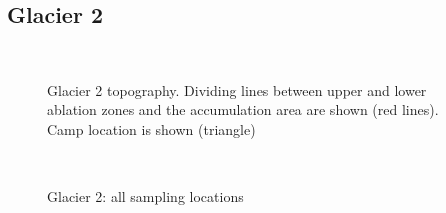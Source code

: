 \documentclass{sfuthesis}
\begin{document}
{\begin{appendices}
\section*{Glacier 2}
	\begin{figure}[H]
	\centering	
	\\
\caption[]{Glacier 2 topography. Dividing lines between upper and lower ablation zones and the accumulation area are shown (red lines). Camp location is shown (triangle) }
\end{figure}
	\begin{figure}[H]
	\centering
	\\
\caption[]{Glacier 2: all sampling locations}
\end{figure}

\end{appendices}}
\end{document}
